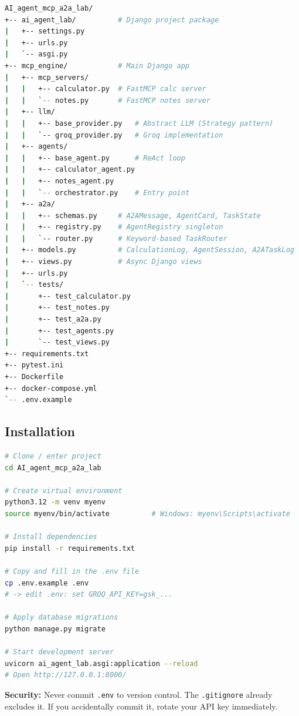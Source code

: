 \documentclass[11pt,a4paper]{article}
\begin{document}
\begin{lstlisting}[language=bash, caption={Project tree}]
AI_agent_mcp_a2a_lab/
+-- ai_agent_lab/          # Django project package
|   +-- settings.py
|   +-- urls.py
|   `-- asgi.py
+-- mcp_engine/            # Main Django app
|   +-- mcp_servers/
|   |   +-- calculator.py  # FastMCP calc server
|   |   `-- notes.py       # FastMCP notes server
|   +-- llm/
|   |   +-- base_provider.py   # Abstract LLM (Strategy pattern)
|   |   `-- groq_provider.py   # Groq implementation
|   +-- agents/
|   |   +-- base_agent.py      # ReAct loop
|   |   +-- calculator_agent.py
|   |   +-- notes_agent.py
|   |   `-- orchestrator.py    # Entry point
|   +-- a2a/
|   |   +-- schemas.py     # A2AMessage, AgentCard, TaskState
|   |   +-- registry.py    # AgentRegistry singleton
|   |   `-- router.py      # Keyword-based TaskRouter
|   +-- models.py          # CalculationLog, AgentSession, A2ATaskLog
|   +-- views.py           # Async Django views
|   +-- urls.py
|   `-- tests/
|       +-- test_calculator.py
|       +-- test_notes.py
|       +-- test_a2a.py
|       +-- test_agents.py
|       `-- test_views.py
+-- requirements.txt
+-- pytest.ini
+-- Dockerfile
+-- docker-compose.yml
`-- .env.example
\end{lstlisting}

\subsection{Installation}

\begin{lstlisting}[language=bash, caption={Environment setup}]
# Clone / enter project
cd AI_agent_mcp_a2a_lab

# Create virtual environment
python3.12 -m venv myenv
source myenv/bin/activate          # Windows: myenv\Scripts\activate

# Install dependencies
pip install -r requirements.txt

# Copy and fill in the .env file
cp .env.example .env
# -> edit .env: set GROQ_API_KEY=gsk_...

# Apply database migrations
python manage.py migrate

# Start development server
uvicorn ai_agent_lab.asgi:application --reload
# Open http://127.0.0.1:8000/
\end{lstlisting}

\begin{warnbox}
\textbf{Security:} Never commit \texttt{.env} to version control. The \texttt{.gitignore}
already excludes it. If you accidentally commit it, rotate your API key immediately.
\end{warnbox}
\end{document}
